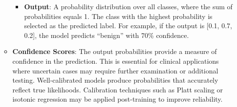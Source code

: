 \begin{itemize}
\begin{itemize}
\begin{itemize}
                    \item \textbf{Output}: A probability distribution over all classes, where the 
                    sum of probabilities equals 1. The class with the highest probability is 
                    selected as the predicted label. For example, if the output is [0.1, 0.7, 0.2], 
                    the model predicts “benign” with 70\% confidence.
                \end{itemize}
            
            \item \textbf{Confidence Scores}: The output probabilities provide a measure of 
            confidence in the prediction. This is essential for clinical applications where 
            uncertain cases may require further examination or additional testing. Well-calibrated 
            models produce probabilities that accurately reflect true likelihoods. Calibration 
            techniques such as Platt scaling or isotonic regression may be applied post-training to 
            improve reliability.
        \end{itemize}
\end{itemize}

